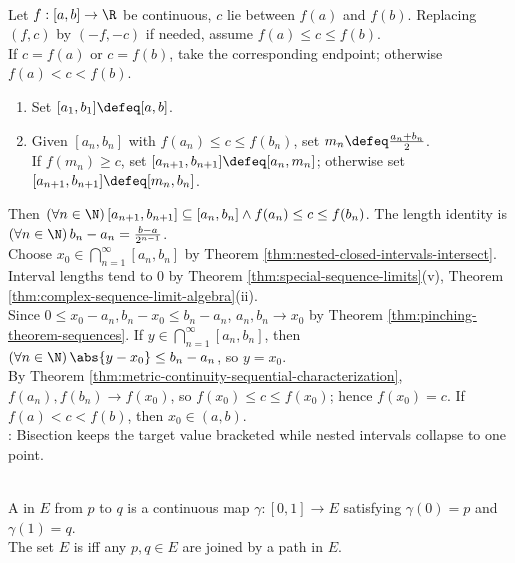 \begin{method} \label{meth:ivt-bisection-nested-intervals} \\
Let $f:[a,b]\to\R$ be continuous, $c$ lie between $f(a)$ and $f(b)$. Replacing $(f,c)$ by $(-f,-c)$ if needed, assume $f(a)\leq c\leq f(b)$.\\
If $c=f(a)$ or $c=f(b)$, take the corresponding endpoint; otherwise $f(a)<c<f(b)$.
\begin{enumerate}[label=(\roman*)]
\setlength{\itemsep}{0pt}
\item Set $[a_1,b_1]\defeq[a,b]$.
\item Given $[a_n,b_n]$ with $f(a_n)\leq c\leq f(b_n)$, set $m_n\defeq\frac{a_n+b_n}{2}$.\\
If $f(m_n)\geq c$, set $[a_{n+1},b_{n+1}]\defeq[a_n,m_n]$; otherwise set $[a_{n+1},b_{n+1}]\defeq[m_n,b_n]$.
\end{enumerate}
Then $(\forall n\in\N)\,[a_{n+1},b_{n+1}]\subseteq[a_n,b_n]\land f(a_n)\leq c\leq f(b_n)$. The length identity is $(\forall n\in\N)\,b_n-a_n=\frac{b-a}{2^{n-1}}$.\\
Choose $x_0\in\bigcap\limits_{n=1}^{\infty}[a_n,b_n]$ by Theorem \ref{thm:nested-closed-intervals-intersect}. Interval lengths tend to $0$ by Theorem \ref{thm:special-sequence-limits}(v), Theorem \ref{thm:complex-sequence-limit-algebra}(ii).\\
Since $0\leq x_0-a_n,b_n-x_0\leq b_n-a_n$, $a_n,b_n\to x_0$ by Theorem \ref{thm:pinching-theorem-sequences}. If $y\in\bigcap\limits_{n=1}^{\infty}[a_n,b_n]$, then $(\forall n\in\N)\,\abs{y-x_0}\leq b_n-a_n$, so $y=x_0$.\\
By Theorem \ref{thm:metric-continuity-sequential-characterization}, $f(a_n),f(b_n)\to f(x_0)$, so $f(x_0)\leq c\leq f(x_0)$; hence $f(x_0)=c$. If $f(a)<c<f(b)$, then $x_0\in(a,b)$.\\
: Bisection keeps the target value bracketed while nested intervals collapse to one point.
\end{method}

\begin{definition} \label{def:path-connected-set} \\
A  in $E$ from $p$ to $q$ is a continuous map $\gamma:[0,1]\to E$ satisfying $\gamma(0)=p$ and $\gamma(1)=q$.\\
The set $E$ is  iff any $p,q\in E$ are joined by a path in $E$.
\end{definition}

